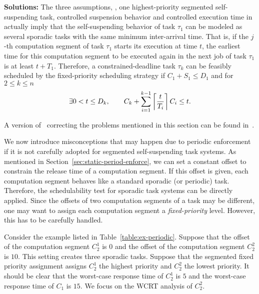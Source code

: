 {\bf Solutions:} The three assumptions, \ie, one highest-priority segmented self-suspending task, controlled suspension behavior and controlled execution time  in \cite{RTSS-KimANR13} actually imply that the self-suspending behavior of task $\tau_1$ can be modeled as several sporadic tasks with the same minimum inter-arrival time. That is, if the $j$-th computation segment of task $\tau_1$ starts its execution at time $t$, the earliest time for this computation segment to be executed again in the next job of task $\tau_1$ is at least $t+T_1$. Therefore, a constrained-deadline task $\tau_k$ can be feasibly scheduled by the fixed-priority scheduling strategy if $C_1+S_1 \leq D_1$ and for $2 \leq k \leq n$
  \begin{equation}
    \label{eq:tda-fixed}
\exists 0 < t \leq D_k, \qquad C_k + \sum_{i=1}^{k-1}\left\lceil{\frac{t}{T_i}}\right\rceil C_i \leq t.    
  \end{equation}

A version of~\cite{RTSS-KimANR13} correcting the problems mentioned in this section can be found in~\cite{Kim2016}.

\label{sec:wrong-periodic}

We now introduce misconceptions that may happen due to periodic enforcement if it is not carefully adopted for segmented self-suspending task systems. As mentioned in Section~\ref{sec:static-period-enforce}, we can set a constant offset to constrain the release time of a computation segment. If this offset is given, each computation segment behaves like a standard sporadic (or periodic) task. Therefore, the schedulability test for sporadic task systems can be directly applied. Since the offsets of two computation segments of a task may be different, one may want to assign each computation segment a \emph{fixed-priority} level.  However, this has to be carefully handled. 



Consider the example listed in Table~\ref{table:ex-periodic}. Suppose that the offset of the computation segment $C_2^1$ is $0$ and the offset of the computation segment $C_2^2$ is $10$. This setting creates three sporadic tasks.
Suppose that the segmented fixed priority assignment assigns $C_2^1$ the highest priority and $C_2^2$ the lowest priority. It should be clear that the worst-case response time of $C_2^1$ is $5$ and the worst-case response time of $C_1$ is $15$. We focus on the WCRT analysis of $C_2^2$.


